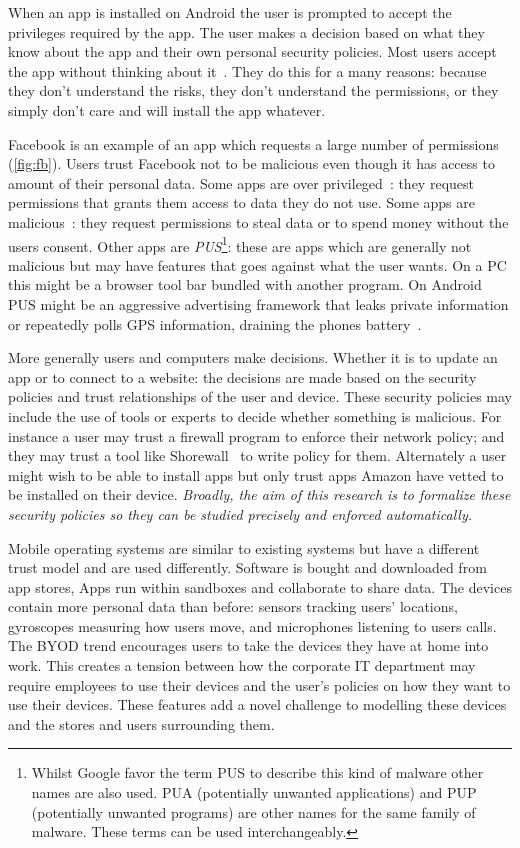 \documentclass[a4paper,sfsidenotes]{%
  article%
}
\begin{document}
When an app is installed on Android the user is prompted to accept the
privileges required by the app.  The user makes a decision based on what they
know about the app and their own personal security policies.  Most users accept
the app without thinking about it~\cite{Felt:2012hm}.  They do this for a many
reasons: because they don't understand the risks, they don't understand the
permissions, or they simply don't care and will install the app whatever.

Facebook is an example of an app which requests a large number of permissions
(\autoref{fig:fb}). Users trust Facebook not to be malicious even though it
has access to amount of their personal data.  Some apps are over
privileged~\cite{Felt:2011kj}: they request permissions that grants them access
to data they do not use. Some apps are malicious~\cite{Zhou:2012cf}: they
request permissions to steal data or to spend money without the users consent.
Other apps are \emph{\ac{PUS}}\footnote{Whilst Google favor the term \ac{PUS} to
describe this kind of malware other names are also used. PUA (potentially
unwanted applications) and PUP (potentially unwanted programs) are other names
for the same family of malware.  These terms can be used interchangeably.}:
these are apps which are generally not malicious but may have features that goes
against what the user wants.  On a PC this might be a browser tool bar bundled
with another program.  On Android \ac{PUS} might be an aggressive advertising
framework that leaks private information or repeatedly polls GPS information,
draining the phones battery~\cite{Svajcer:2013tp}.

More generally users and computers make decisions. Whether it is to update an
app or to connect to a website: the decisions are made based on the security
policies and trust relationships of the user and device.  These security
policies may include the use of tools or experts to decide whether something is
malicious.  For instance a user may trust a firewall program to enforce their
network policy; and they may trust a tool like
{Shorewall}~\cite{Shorewall:uh,Tongaonkar:2007ua} to write
policy for them.  Alternately a user might wish to be able to install apps but
only trust apps {Amazon} have vetted to be installed on their device.
\emph{Broadly, the aim of this research is to formalize these security policies
so they can be studied precisely and enforced automatically.}

Mobile operating systems are similar to existing systems but have a
different trust model and are used differently.  Software is
bought and downloaded from app stores, Apps run within sandboxes and collaborate
to share data. The devices contain more personal data
than before: sensors tracking users' locations,  gyroscopes measuring how
users move, and microphones listening to users calls.  The \ac{BYOD} trend
encourages users to take the devices they have at home into work.
This creates a tension between how the corporate IT department may require
employees to use their devices and the user's policies on how they want to use
their devices.  These features add a novel challenge to modelling these devices
and the stores and users surrounding them.  
\end{document}

